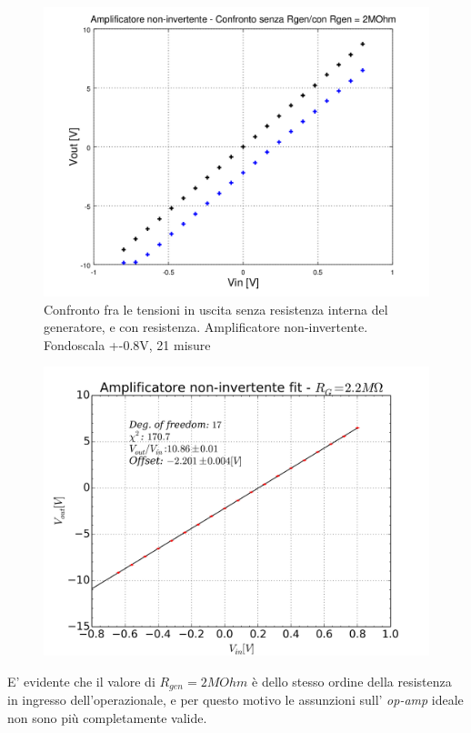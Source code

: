 \documentclass[journal, a4paper]{IEEEtran}
\begin{document}
\begin{figure}
\centering
\includegraphics[width=0.9\linewidth]{./non-inv_0_8-21_rgen_2mo_confronto}
\caption{Confronto fra le tensioni in uscita senza resistenza interna del generatore, e con resistenza. Amplificatore non-invertente. Fondoscala +-0.8V, 21 misure}
\label{fig:non-inv_0_8-21_rgen_2mo_confronto}
\end{figure}

\begin{figure}
\centering
\includegraphics[width=0.9\linewidth]{./fit_non-invertente_rgen_2mo}
\caption{}
\label{fig:fit_non-invertente_rgen_2mo}
\end{figure}

E' evidente che il valore di  $R_{gen} = 2M\si{Ohm} $ è dello stesso ordine della resistenza in ingresso dell'operazionale, e per questo motivo le assunzioni sull' \textit{op-amp} ideale non sono più completamente valide. \\
\end{document}
